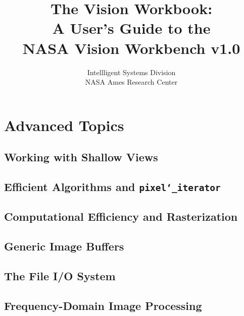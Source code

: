 \documentclass[letterpaper,12pt]{book}
\title{{\Huge The Vision Workbook:}\\A User's Guide to the\\NASA Vision Workbench v1.0}
\author{%
Intellligent Systems Division\\
NASA Ames Research Center}
\begin{document}
\maketitle









\chapter{Advanced Topics}\label{ch:advanced-topics}

\section{Working with Shallow Views}\label{sec:advanced.shallow}

\section{Efficient Algorithms and {\tt pixel\char`\_iterator}}

\section{Computational Efficiency and Rasterization}

\section{Generic Image Buffers}\label{sec:advanced.generic}

\section{The File I/O System}\label{sec:advanced.fileio}

\section{Frequency-Domain Image Processing}\label{sec:advanced.frequency}
\end{document}
